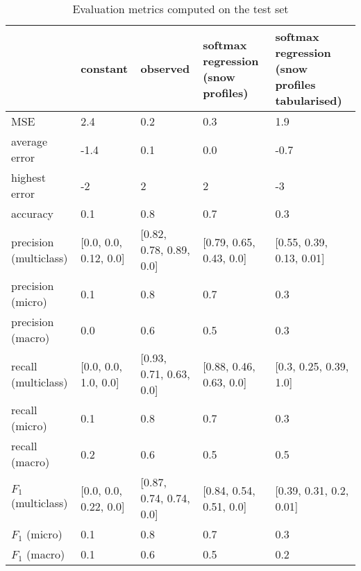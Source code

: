 \begin{table}[H]
\caption{Evaluation metrics computed on the test set}
\label{tbl:sais_eval_test}
\begin{tabular}{lllll}
\toprule
 & constant & observed & softmax regression (snow profiles) & softmax regression (snow profiles tabularised) \\
\midrule
MSE & 2.4 & 0.2 & 0.3 & 1.9 \\
average error & -1.4 & 0.1 & 0.0 & -0.7 \\
highest error & -2 & 2 & 2 & -3 \\
accuracy & 0.1 & 0.8 & 0.7 & 0.3 \\
precision (multiclass) & [0.0, 0.0, 0.12, 0.0] & [0.82, 0.78, 0.89, 0.0] & [0.79, 0.65, 0.43, 0.0] & [0.55, 0.39, 0.13, 0.01] \\
precision (micro) & 0.1 & 0.8 & 0.7 & 0.3 \\
precision (macro) & 0.0 & 0.6 & 0.5 & 0.3 \\
recall (multiclass) & [0.0, 0.0, 1.0, 0.0] & [0.93, 0.71, 0.63, 0.0] & [0.88, 0.46, 0.63, 0.0] & [0.3, 0.25, 0.39, 1.0] \\
recall (micro) & 0.1 & 0.8 & 0.7 & 0.3 \\
recall (macro) & 0.2 & 0.6 & 0.5 & 0.5 \\
$F_1$ (multiclass) & [0.0, 0.0, 0.22, 0.0] & [0.87, 0.74, 0.74, 0.0] & [0.84, 0.54, 0.51, 0.0] & [0.39, 0.31, 0.2, 0.01] \\
$F_1$ (micro) & 0.1 & 0.8 & 0.7 & 0.3 \\
$F_1$ (macro) & 0.1 & 0.6 & 0.5 & 0.2 \\
\bottomrule
\end{tabular}
\end{table}
